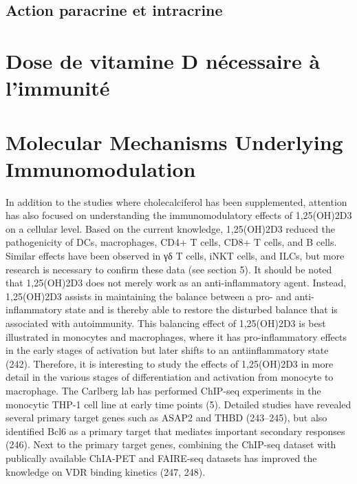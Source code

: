\documentclass[
  a4paper,
  DIV=11,
  numbers=noendperiod,
  listof=totoc]{scrreprt}
\begin{document}
\autocite{Bishop.2021}

\hypertarget{action-paracrine-et-intracrine}{%
\subsection{Action paracrine et
intracrine}\label{action-paracrine-et-intracrine}}

\hypertarget{dose-de-vitamine-d-nuxe9cessaire-uxe0-limmunituxe9}{%
\section{Dose de vitamine D nécessaire à
l'immunité}\label{dose-de-vitamine-d-nuxe9cessaire-uxe0-limmunituxe9}}

\textcite{Hewison.2007}

\hypertarget{molecular-mechanisms-underlying-immunomodulation}{%
\section{Molecular Mechanisms Underlying
Immunomodulation}\label{molecular-mechanisms-underlying-immunomodulation}}

\textcite{Dankers.2017}

In addition to the studies where cholecalciferol has been supplemented,
attention has also focused on understanding the immunomodulatory effects
of 1,25(OH)2D3 on a cellular level. Based on the current knowledge,
1,25(OH)2D3 reduced the pathogenicity of DCs, macrophages, CD4+ T cells,
CD8+ T cells, and B cells. Similar effects have been observed in γδ T
cells, iNKT cells, and ILCs, but more research is necessary to confirm
these data (see section 5). It should be noted that 1,25(OH)2D3 does not
merely work as an anti-inflammatory agent. Instead, 1,25(OH)2D3 assists
in maintaining the balance between a pro- and anti-inflammatory state
and is thereby able to restore the disturbed balance that is associated
with autoimmunity. This balancing effect of 1,25(OH)2D3 is best
illustrated in monocytes and macrophages, where it has pro-inflammatory
effects in the early stages of activation but later shifts to an
antiinflammatory state (242). Therefore, it is interesting to study the
effects of 1,25(OH)2D3 in more detail in the various stages of
differentiation and activation from monocyte to macrophage. The Carlberg
lab has performed ChIP-seq experiments in the monocytic THP-1 cell line
at early time points (5). Detailed studies have revealed several primary
target genes such as ASAP2 and THBD (243--245), but also identified Bcl6
as a primary target that mediates important secondary responses (246).
Next to the primary target genes, combining the ChIP-seq dataset with
publically available ChIA-PET and FAIRE-seq datasets has improved the
knowledge on VDR binding kinetics (247, 248).
\end{document}
